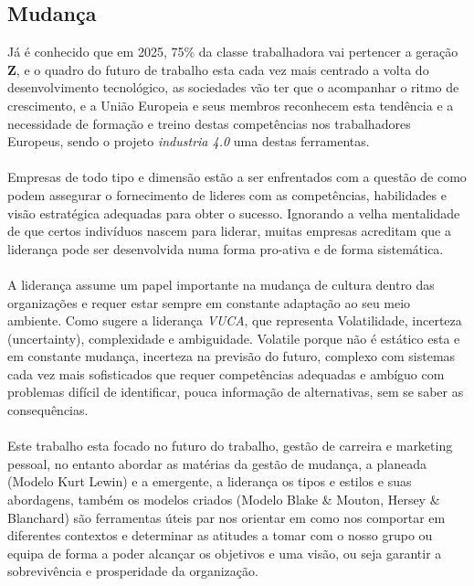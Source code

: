 \subsection{Mudança}
\qquad Já é conhecido que em \textsf{2025}, 75\% da classe trabalhadora vai pertencer a geração \textbf{Z}, e o quadro do futuro de trabalho esta cada vez mais centrado a volta do desenvolvimento tecnológico, as sociedades vão ter que o acompanhar o ritmo de crescimento, e a União Europeia e seus membros reconhecem esta tendência e a necessidade de formação e treino destas competências nos trabalhadores Europeus, sendo o projeto \textit{industria 4.0} uma destas ferramentas.\\
\\
Empresas de todo tipo e dimensão estão a ser enfrentados com a questão de como podem assegurar o fornecimento de lideres com as competências, habilidades e visão estratégica adequadas para obter o sucesso. Ignorando a velha mentalidade de que certos indivíduos nascem para liderar, muitas empresas acreditam que a liderança pode ser desenvolvida numa forma pro-ativa e de forma sistemática.\cite{book_6}\\
\\
A liderança assume um papel importante na mudança de cultura dentro das organizações e requer estar sempre em constante adaptação ao seu meio ambiente. Como sugere a liderança \textit{VUCA}, que representa Volatilidade, incerteza (uncertainty), complexidade e ambiguidade. Volatile porque não é estático esta e em constante mudança, incerteza na previsão do futuro, complexo com sistemas cada vez mais sofisticados que requer competências adequadas e ambíguo com problemas difícil de identificar, pouca informação de alternativas, sem se saber as consequências.\\
\\
Este trabalho esta focado no futuro do trabalho, gestão de carreira e marketing pessoal, no entanto abordar as matérias da gestão de mudança, a planeada (Modelo Kurt Lewin) e a emergente, a liderança os tipos e estilos e suas abordagens, também os modelos criados (Modelo Blake \& Mouton, Hersey \& Blanchard) são ferramentas úteis par nos orientar em como nos comportar em diferentes contextos e determinar as atitudes a tomar com o nosso grupo ou equipa de forma a poder alcançar os objetivos e uma visão, ou seja garantir a sobrevivência e prosperidade da organização.
\newpage
